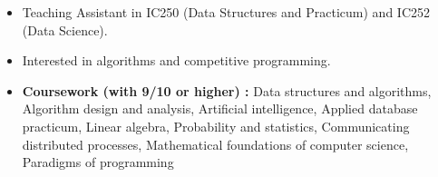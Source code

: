 \documentclass[]{awesome-cv}
\begin{document}
\vspace{-2mm}




\begin{itemize}
	\item Teaching Assistant in IC250 (Data Structures and Practicum) and IC252 (Data Science). 
	\item Interested in algorithms and competitive programming.
	\item \textbf{Coursework (with 9/10 or higher) :} Data structures and algorithms, Algorithm design and analysis, Artificial intelligence, Applied database practicum, Linear algebra, Probability and statistics, Communicating distributed processes, Mathematical foundations of computer science, Paradigms of programming
\end{itemize}



\vspace{-8mm}
\ 
\end{document}
